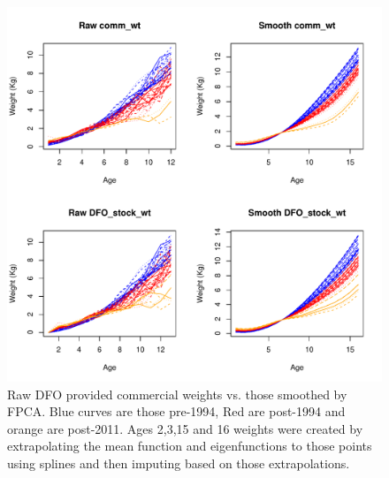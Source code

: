 \documentclass[11pt]{article}\usepackage[]{graphicx}\usepackage[]{color}
\makeatletter
\def\maxwidth{ %
  \ifdim\Gin@nat@width>\linewidth
    \linewidth
  \else
    \Gin@nat@width
  \fi
}
\newenvironment{knitrout}{}{} %
\makeatother
\begin{document}
\begin{knitrout}
\color{fgcolor}\begin{figure}
\includegraphics[width=\maxwidth]{figure/weightFPCAp-1} \caption[Raw DFO provided commercial weights vs]{Raw DFO provided commercial weights vs. those smoothed by FPCA. Blue curves are those pre-1994, Red are post-1994 and orange are post-2011. Ages 2,3,15 and 16 weights were created by extrapolating the mean function and eigenfunctions to those points using splines and then imputing based on those extrapolations.}\label{fig:weightFPCAp}
\end{figure}


\end{knitrout}
\end{document}

